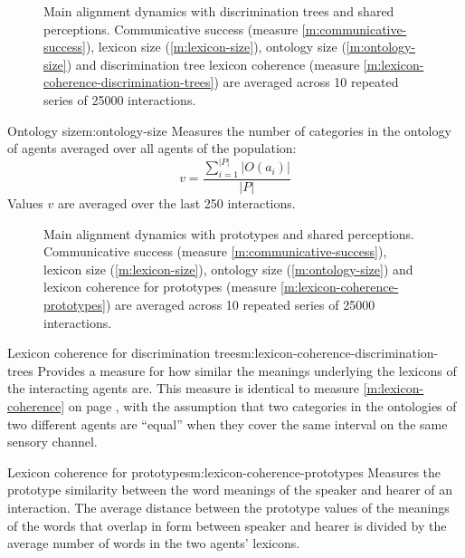 \begin{figure}[t]
  \caption{Main alignment dynamics with discrimination trees and
    shared perceptions. Communicative success (measure
    \ref{m:communicative-success}), lexicon size
    (\ref{m:lexicon-size}), ontology size (\ref{m:ontology-size}) and
    discrimination tree lexicon coherence (measure
    \ref{m:lexicon-coherence-discrimination-trees}) are averaged
    across 10 repeated series of 25000 interactions.}
  \label{f:ggg-dt-mw-structured-same-perception-success+lexicon+ontology}
\end{figure}


\begin{measure}[b]{Ontology size}{m:ontology-size}
  Measures the number of categories in the ontology of agents averaged
  over all agents of the population: $$v = \frac{\sum_{i=1}^{|P|}
    |O(a_i)|}{|P|}$$ Values $v$ are averaged over the last 250
  interactions.
\end{measure}

\begin{figure}[t]
  \caption{Main alignment dynamics with prototypes and shared
    perceptions. Communicative success (measure
    \ref{m:communicative-success}), lexicon size
    (\ref{m:lexicon-size}), ontology size (\ref{m:ontology-size}) and
    lexicon coherence for prototypes (measure
    \ref{m:lexicon-coherence-prototypes}) are averaged
    across 10 repeated series of 25000 interactions.}
  \label{f:ggg-p-mw-structured-same-perception-success+lexicon+ontology}
\end{figure}


\begin{measure}[b]{Lexicon coherence for discrimination
    trees}{m:lexicon-coherence-discrimination-trees}
  Provides a measure for how similar the meanings underlying the
  lexicons of the interacting agents are. This measure is identical to
  measure \ref{m:lexicon-coherence} on page
  \pageref{m:lexicon-coherence}, with the assumption that two
  categories in the ontologies of two different agents are ``equal''
  when they cover the same interval on the same sensory channel.
\end{measure}

\begin{measure}[b]{Lexicon coherence for
    prototypes}{m:lexicon-coherence-prototypes}
  Measures the prototype similarity between the word meanings of the
  speaker and hearer of an interaction. The average distance between
  the prototype values of the meanings of the words that overlap in
  form between speaker and hearer is divided by the average number of
  words in the two agents' lexicons.
\end{measure}


